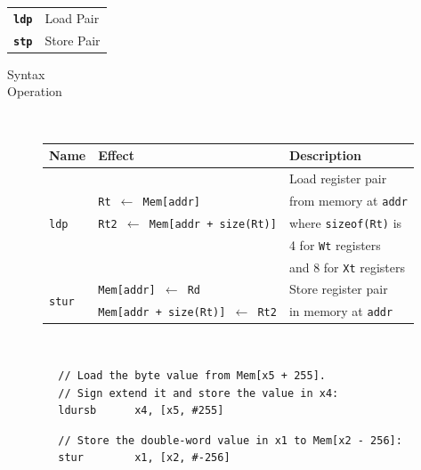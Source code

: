 \begin{table}[h!]
	\begin{tabular}{ll}
		\texttt{\bf ldp} & Load Pair \\
		\texttt{\bf stp} & Store Pair
	\end{tabular}
\end{table}
\begin{description}
	\item[Syntax] 
	\item[Operation] \ \begin{table}[h!]
		\begin{tabular}{lll}
			\textbf{Name} & \textbf{Effect} & \textbf{Description} \\ \hline
			\multirow{5}{*}{\texttt{ldp}} & & Load register pair\\
			& \texttt{Rt $\gets$ Mem[addr]}&  from memory at \texttt{addr}\\
			& \texttt{Rt2 $\gets$ Mem[addr + size(Rt)]} & where \texttt{sizeof(Rt)} is \\
			& & 4 for \texttt{Wt} registers \\
			& & and 8 for \texttt{Xt} registers \\ \hline
			\multirow{2}{*}{\texttt{stur}} & \texttt{Mem[addr] $\gets$ Rd} & Store register pair \\
			& \texttt{Mem[addr + size(Rt)] $\gets$ Rt2} & in memory at \texttt{addr}
		\end{tabular}
	\end{table}
\end{description}
\begin{example*}
	\ \begin{lstlisting}
		// Load the byte value from Mem[x5 + 255]. 
		// Sign extend it and store the value in x4:
		ldursb		x4, [x5, #255]
	\end{lstlisting}
	\begin{lstlisting}
		// Store the double-word value in x1 to Mem[x2 - 256]:
		stur		x1, [x2, #-256]
	\end{lstlisting}
\end{example*}

